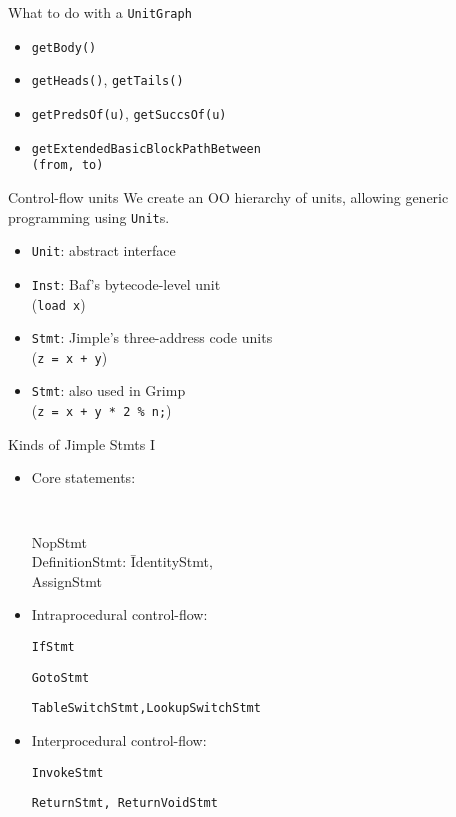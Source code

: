 \begin{slide}{What to do with a {\tt UnitGraph}}
\begin{itemize}
\item {\tt getBody()}
\item {\tt getHeads()}, {\tt getTails()}
\item {\tt getPredsOf(u)}, {\tt getSuccsOf(u)}
\item {\tt getExtendedBasicBlockPathBetween\\
                (from, to)}
\end{itemize}
\end{slide}

\begin{slide}{Control-flow units}
We create an OO hierarchy of units, allowing generic programming using
{\tt Unit}s.

\begin{itemize}
\item {\tt Unit}: abstract interface

\item {\tt Inst}: Baf's bytecode-level unit\\
\qquad \qquad ({\tt load x})

\item {\tt Stmt}: Jimple's three-address code units\\
\qquad \qquad ({\tt z = x + y})

\item {\tt Stmt}: also used in Grimp\\
\qquad \qquad ({\tt z = x + y * 2 \% n;})
\end{itemize}
\end{slide}

\begin{slide}{Kinds of Jimple Stmts I}
\vspace*{-0.1in}
\begin{itemize}
\item Core statements:
\vspace*{-0.1in}
{\tt 
\begin{tabbing}
\quad NopStmt \\
\quad DefinitionStmt: \= IdentityStmt, \\
                \>AssignStmt 
\end{tabbing}}

\vspace*{-0.1in}
\item Intraprocedural control-flow:

{\tt \quad IfStmt}

{\tt \quad GotoStmt}

{\tt \quad TableSwitchStmt,LookupSwitchStmt}

\item Interprocedural control-flow:

{\tt \quad InvokeStmt}

{\tt \quad ReturnStmt, ReturnVoidStmt}

\end{itemize}
\end{slide}

